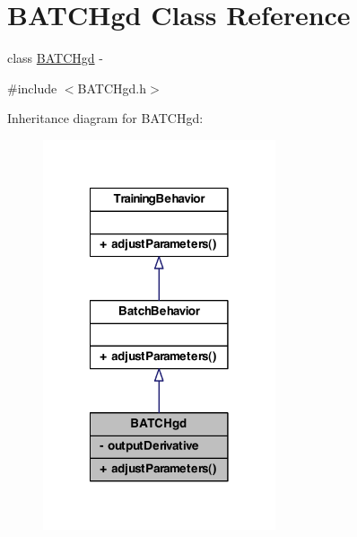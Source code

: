 \hypertarget{class_b_a_t_c_hgd}{
\section{BATCHgd Class Reference}
\label{class_b_a_t_c_hgd}
}


class \hyperlink{class_b_a_t_c_hgd}{BATCHgd} -\/  




{\ttfamily \#include $<$BATCHgd.h$>$}



Inheritance diagram for BATCHgd:
\nopagebreak
\begin{figure}[H]
\begin{center}
\leavevmode
\includegraphics[width=194pt]{class_b_a_t_c_hgd__inherit__graph}
\end{center}
\end{figure}



